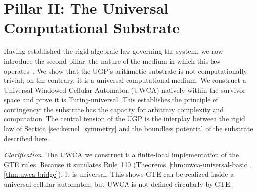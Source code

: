 \documentclass[12pt]{article}
\numberwithin{equation}{section}
\begin{document}
\section{Pillar II: The Universal Computational Substrate}\label{sec:uwca_universality}

Having established the rigid algebraic law governing the system, we now introduce the second pillar: the nature of the medium in which this law operates~\cite{SpivackUGPFormalization,ugp-lean}. We show that the UGP's arithmetic substrate is not computationally trivial; on the contrary, it is a universal computational medium. We construct a Universal Windowed Cellular Automaton (UWCA) natively within the survivor space and prove it is Turing-universal. This establishes the principle of contingency: the substrate has the capacity for arbitrary complexity and computation. The central tension of the UGP is the interplay between the rigid law of Section \ref{sec:kernel_symmetry} and the boundless potential of the substrate described here.

\noindent\emph{Clarification.} The UWCA we construct is a finite-local implementation of the GTE rules. Because it simulates Rule~110 (Theorems~\ref{thm:uwca-universal-basic}, \ref{thm:uwca-bridge}), it is universal. This shows GTE can be realized inside a universal cellular automaton, but UWCA is not defined circularly by GTE.


\end{document}
